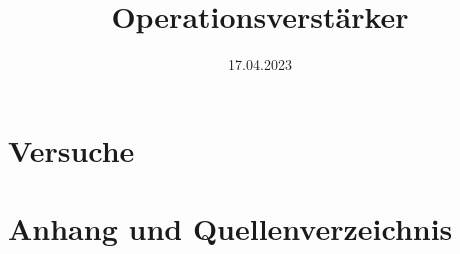 
\title{Operationsverstärker}
\date{17.04.2023}

    \maketitle
    \newpage
    
    
    
    \newpage
    \part{Versuche}
    
    \newpage
    
    
    \newpage
    \part{Anhang und Quellenverzeichnis}
    \printbibliography[heading=bibnumbered,title=Referenzen und Literatur]
    
